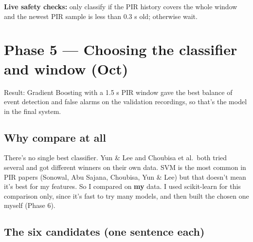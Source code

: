 \documentclass[11pt,a4paper]{article}
\begin{document}
\textbf{Live safety checks:}
only classify if the PIR
history covers the whole
window and the newest PIR
sample is less than 0.3 s old;
otherwise wait.

\hypertarget{phase-5-choosing-the-classifier-and-window-oct}{%
\section{Phase 5 --- Choosing
the classifier and window
(Oct)}\label{phase-5-choosing-the-classifier-and-window-oct}}

Result: Gradient Boosting with
a 1.5 s PIR window gave the
best balance of event
detection and false alarms on
the validation recordings, so
that's the model in the final
system.

\hypertarget{why-compare-at-all}{%
\subsection{Why compare at
all}\label{why-compare-at-all}}

There's no single best
classifier. Yun \& Lee and
Choubisa et al.~both tried
several and got different
winners on their own data. SVM
is the most common in PIR
papers (Sonowal, Abu Sajana,
Choubisa, Yun \& Lee) but that
doesn't mean it's best for my
features. So I compared on
\textbf{my} data. I used
scikit-learn for this
comparison only, since it's
fast to try many models, and
then built the chosen one
myself (Phase 6).

\hypertarget{the-six-candidates-one-sentence-each}{%
\subsection{The six candidates
(one sentence
each)}\label{the-six-candidates-one-sentence-each}}
\end{document}
